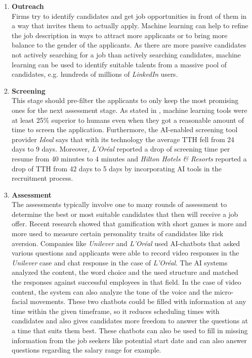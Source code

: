 \documentclass[draft,final]{thesisclass} %
\begin{document}
\begin{enumerate}
    \item \textbf{Outreach}\\
    Firms try to identify candidates and get job opportunities in front of them in a way that invites them to
    actually apply. Machine learning can help to refine the job description in ways to attract more applicants or to bring more balance to the gender of the applicants. As there are more passive candidates not actively searching for a job than actively searching candidates, machine learning can be used to identify suitable talents from a massive pool of candidates, e.g. hundreds of millions of \textit{LinkedIn} users.
    \item \textbf{Screening}\\
    This stage should pre-filter the applicants to only keep the most promising ones for the next assessment stage.
    As stated in \cite[6]{ai_recruiting}, machine learning tools were at least 25\% superior to humans even when they got a reasonable amount of time to screen the application. Furthermore, the AI-enabled screening tool provider \textit{Ideal} says that with its technology the average \gls{TTH} fell from 24 days to 9 days.
    Moreover, \textit{L'Oréal} reported a drop of screening time per resume from 40 minutes to 4 minutes and \textit{Hilton Hotels \& Resorts} reported a drop of \gls{TTH} from 42 days to 5 days by incorporating AI tools in the recruitment process.
    \item \textbf{Assessment}\\
    The assessments typically involve one to many rounds of assessment to determine the best or most suitable candidates that then will receive a job offer. Recent research showed that gamification with short games is more and more used to measure certain personality traits of candidates like risk aversion. Companies like \textit{Unilever} and \textit{L'Oréal} used AI-chatbots that asked various questions and applicants were able to record video responses in the \textit{Unilever} case and chat response in the case of \textit{L'Oréal}. The AI systems analyzed the content, the word choice and the used structure and matched the responses against successful employees in that field. In the case of video content, the system can also analyze the tone of the voice and the micro-facial movements. These two chatbots could be filled with information at any time within the given timeframe, so it reduces scheduling times with candidates and also gives candidates more freedom to answer the questions at a time that suits them best. These chatbots can also be used to fill in missing information from the job seekers like potential start date and can also answer questions regarding the salary range for example.

\end{enumerate}
\end{document}
